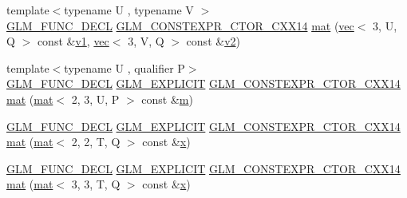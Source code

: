 \begin{DoxyCompactItemize}
\item 
{\footnotesize template$<$typename U , typename V $>$ }\\\hyperlink{setup_8hpp_ab2d052de21a70539923e9bcbf6e83a51}{G\+L\+M\+\_\+\+F\+U\+N\+C\+\_\+\+D\+E\+CL} \hyperlink{setup_8hpp_a0900f9145e68bf6061b6f5e7be3fa751}{G\+L\+M\+\_\+\+C\+O\+N\+S\+T\+E\+X\+P\+R\+\_\+\+C\+T\+O\+R\+\_\+\+C\+X\+X14} \hyperlink{structglm_1_1mat_3_012_00_013_00_01_t_00_01_q_01_4_adac199e52e2fbdfe33f528a5aef395bc}{mat} (\hyperlink{structglm_1_1vec}{vec}$<$ 3, U, Q $>$ const \&\hyperlink{_s_d_l__opengl__glext_8h_a435c176a02c061b43e19bdf7c86cceae}{v1}, \hyperlink{structglm_1_1vec}{vec}$<$ 3, V, Q $>$ const \&\hyperlink{_s_d_l__opengl__glext_8h_a0928f6d0f0f794ba000a21dfae422136}{v2})
\item 
{\footnotesize template$<$typename U , qualifier P$>$ }\\\hyperlink{setup_8hpp_ab2d052de21a70539923e9bcbf6e83a51}{G\+L\+M\+\_\+\+F\+U\+N\+C\+\_\+\+D\+E\+CL} \hyperlink{setup_8hpp_a6c74f5a5e7b134ab69023ff9a30d4d5d}{G\+L\+M\+\_\+\+E\+X\+P\+L\+I\+C\+IT} \hyperlink{setup_8hpp_a0900f9145e68bf6061b6f5e7be3fa751}{G\+L\+M\+\_\+\+C\+O\+N\+S\+T\+E\+X\+P\+R\+\_\+\+C\+T\+O\+R\+\_\+\+C\+X\+X14} \hyperlink{structglm_1_1mat_3_012_00_013_00_01_t_00_01_q_01_4_a1c561950eeef2c86735f4c6a65a8f1d8}{mat} (\hyperlink{structglm_1_1mat}{mat}$<$ 2, 3, U, P $>$ const \&\hyperlink{_s_d_l__opengl__glext_8h_af593500c283bf1a787a6f947f503a5c2}{m})
\item 
\hyperlink{setup_8hpp_ab2d052de21a70539923e9bcbf6e83a51}{G\+L\+M\+\_\+\+F\+U\+N\+C\+\_\+\+D\+E\+CL} \hyperlink{setup_8hpp_a6c74f5a5e7b134ab69023ff9a30d4d5d}{G\+L\+M\+\_\+\+E\+X\+P\+L\+I\+C\+IT} \hyperlink{setup_8hpp_a0900f9145e68bf6061b6f5e7be3fa751}{G\+L\+M\+\_\+\+C\+O\+N\+S\+T\+E\+X\+P\+R\+\_\+\+C\+T\+O\+R\+\_\+\+C\+X\+X14} \hyperlink{structglm_1_1mat_3_012_00_013_00_01_t_00_01_q_01_4_a66345b384cd179e59bb2f137736bc228}{mat} (\hyperlink{structglm_1_1mat}{mat}$<$ 2, 2, T, Q $>$ const \&\hyperlink{_s_d_l__opengl_8h_ad0e63d0edcdbd3d79554076bf309fd47}{x})
\item 
\hyperlink{setup_8hpp_ab2d052de21a70539923e9bcbf6e83a51}{G\+L\+M\+\_\+\+F\+U\+N\+C\+\_\+\+D\+E\+CL} \hyperlink{setup_8hpp_a6c74f5a5e7b134ab69023ff9a30d4d5d}{G\+L\+M\+\_\+\+E\+X\+P\+L\+I\+C\+IT} \hyperlink{setup_8hpp_a0900f9145e68bf6061b6f5e7be3fa751}{G\+L\+M\+\_\+\+C\+O\+N\+S\+T\+E\+X\+P\+R\+\_\+\+C\+T\+O\+R\+\_\+\+C\+X\+X14} \hyperlink{structglm_1_1mat_3_012_00_013_00_01_t_00_01_q_01_4_abab129cea1f004a6341b1ed2691600f4}{mat} (\hyperlink{structglm_1_1mat}{mat}$<$ 3, 3, T, Q $>$ const \&\hyperlink{_s_d_l__opengl_8h_ad0e63d0edcdbd3d79554076bf309fd47}{x})

\end{DoxyCompactItemize}
